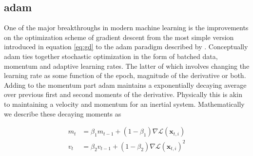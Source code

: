 \subsection{adam}\label{sec:adam}
One of the major breakthroughs in modern machine learning is the improvements on the optimization scheme of gradient descent from the most simple version introduced in equation \ref{eq:gd} to the adam paradigm described by \citet{Kingma2015}. Conceptually adam ties together stochastic optimization in the form of batched data, momentum and adaptive learning rates. The latter of which involves changing the learning rate as some function of the epoch, magnitude of the derivative or both. Adding to the momentum part adam maintains a exponentially decaying average over previous first and second moments of the derivative. Physically this is akin to maintaining a velocity and momentum for an inertial system. Mathematically we describe these decaying moments as 

\begin{align}
m_t &= \beta_1 m_{t-1} +(1-\beta_1)\nabla \mathcal{L}(\mathbf{x}_{t, i}) \\
v_t &= \beta_2 v_{t-1} +(1-\beta_2)\nabla \mathcal{L}(\mathbf{x}_{t, i})^2
\end{align}


